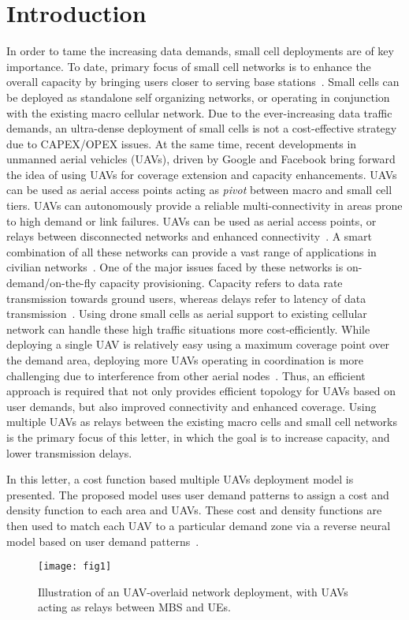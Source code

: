 \documentclass[journal]{IEEEtran}
\begin{document}
\IEEEpeerreviewmaketitle



\section{Introduction}
In order to tame the increasing data demands, small cell deployments are of key importance. To date, primary focus of small cell networks is to enhance the overall capacity by bringing users closer to serving base stations~\cite{li2014throughput}. Small cells can be deployed as standalone self organizing networks, or operating in conjunction with the existing macro cellular network. Due to the ever-increasing data traffic demands, an ultra-dense deployment of small cells is not a cost-effective strategy due to CAPEX/OPEX issues. At the same time, recent developments in unmanned aerial vehicles (UAVs), driven by Google and Facebook bring forward the idea of using UAVs for coverage extension and capacity enhancements. UAVs can be used as aerial access points acting as \emph{pivot} between macro and small cell tiers. UAVs can autonomously provide a reliable multi-connectivity in areas prone to high demand or link failures. UAVs can be used as aerial access points, or relays between disconnected networks and enhanced connectivity~\cite{guo2014performance}. A smart combination of all these networks can provide a vast range of applications in civilian networks~\cite{merwaday2015uav}. One of the major issues faced by these networks is on-demand/on-the-fly capacity provisioning. Capacity refers to data rate transmission towards ground users, whereas delays refer to latency of data transmission~\cite{mozaffari2015unmanned}. Using drone small cells as aerial support to existing cellular network can handle these high traffic situations more cost-efficiently. While deploying a single UAV is relatively easy using a maximum coverage point over the demand area, deploying more UAVs operating in coordination is more challenging due to interference from other aerial nodes~\cite{mozaffari2015drone}. Thus, an efficient approach is required that not only provides efficient topology for UAVs based on user demands, but also improved connectivity and enhanced coverage. Using multiple UAVs as relays between the existing macro cells and small cell networks is the primary focus of this letter, in which the goal is to increase capacity, and lower transmission delays.

In this letter, a cost function based multiple UAVs deployment model is presented. The proposed model uses user demand patterns to assign a cost and density function to each area and UAVs. These cost and density functions are then used to match each UAV to a particular demand zone via a reverse neural model based on user demand patterns~\cite{chandrashekarappa2014forward}.
\begin{figure}[!hb]
  \centering
\texttt{[image: fig1]}\\
  \caption{Illustration of an UAV-overlaid network deployment, with UAVs acting as relays between MBS and UEs.}\label{fig1}
\end{figure}
\end{document}
